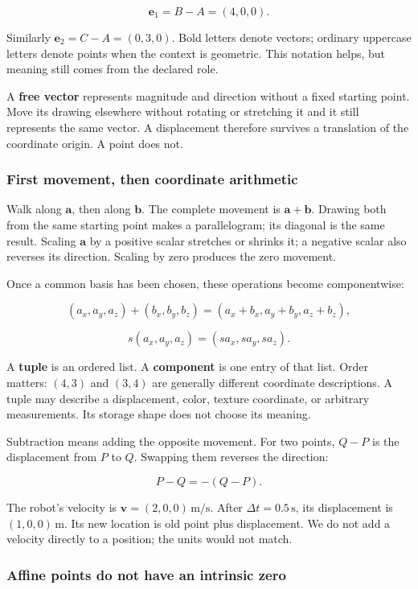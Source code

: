 \[
\mathbf e_1=B-A=(4,0,0).
\]

Similarly \(\mathbf e_2=C-A=(0,3,0)\). Bold letters denote vectors; ordinary uppercase letters denote points when the context is geometric. This notation helps, but meaning still comes from the declared role.

A \textbf{free vector} represents magnitude and direction without a fixed starting point. Move its drawing elsewhere without rotating or stretching it and it still represents the same vector. A displacement therefore survives a translation of the coordinate origin. A point does not.

\subsubsection{First movement, then coordinate arithmetic}\label{01-foundations-i-ch017-first-movement-then-coordinate-arithmetic}

Walk along \(\mathbf a\), then along \(\mathbf b\). The complete movement is \(\mathbf a+\mathbf b\). Drawing both from the same starting point makes a parallelogram; its diagonal is the same result. Scaling \(\mathbf a\) by a positive scalar stretches or shrinks it; a negative scalar also reverses its direction. Scaling by zero produces the zero movement.

Once a common basis has been chosen, these operations become componentwise:

\[
(a_x,a_y,a_z)+(b_x,b_y,b_z)
=(a_x+b_x,a_y+b_y,a_z+b_z),
\]

\[
s(a_x,a_y,a_z)=(sa_x,sa_y,sa_z).
\]

A \textbf{tuple} is an ordered list. A \textbf{component} is one entry of that list. Order matters: \((4,3)\) and \((3,4)\) are generally different coordinate descriptions. A tuple may describe a displacement, color, texture coordinate, or arbitrary measurements. Its storage shape does not choose its meaning.

Subtraction means adding the opposite movement. For two points, \(Q-P\) is the displacement from \(P\) to \(Q\). Swapping them reverses the direction:

\[
P-Q=-(Q-P).
\]

The robot's velocity is \(\mathbf v=(2,0,0)\,\mathrm{m/s}\). After \(\Delta t=0.5\,\mathrm s\), its displacement is \((1,0,0)\,\mathrm m\). Its new location is old point plus displacement. We do not add a velocity directly to a position; the units would not match.

\subsubsection{Affine points do not have an intrinsic zero}\label{01-foundations-i-ch017-affine-points-do-not-have-an-intrinsic-zero}

